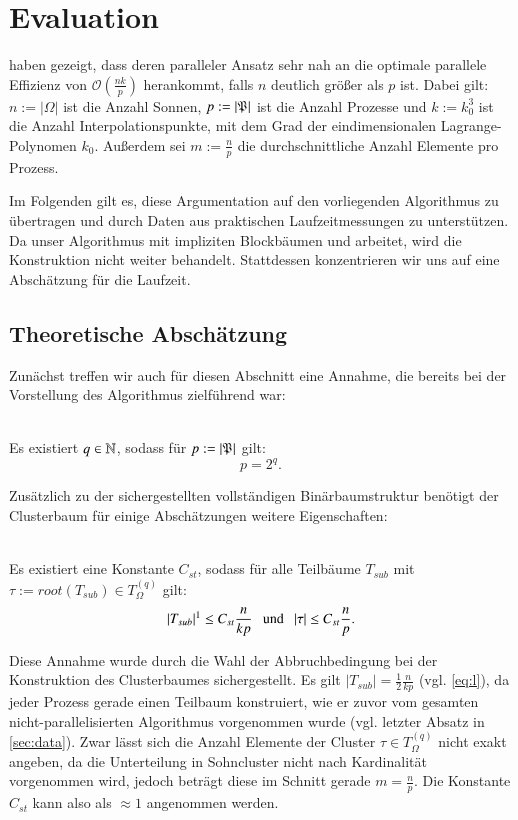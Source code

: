 \chapter{Evaluation}
\label{chp:eval}
  \citet{distrh2} haben gezeigt, dass deren paralleler Ansatz sehr nah an die optimale parallele Effizienz von $\mathcal{O}(\frac{nk}{p})$ herankommt, falls $n$ deutlich größer als $p$ ist.
  Dabei gilt: $n := |\Omega|$ ist die Anzahl Sonnen, $p := |\mathfrak{P}|$ ist die Anzahl Prozesse und $k := k_0^3$ ist die Anzahl Interpolationspunkte, mit dem Grad der eindimensionalen Lagrange-Polynomen 
  $k_0$. Außerdem sei $m := \frac{n}{p}$ die durchschnittliche Anzahl Elemente pro Prozess.
  
  Im Folgenden gilt es, diese Argumentation auf den vorliegenden Algorithmus zu übertragen und durch Daten aus praktischen Laufzeitmessungen zu unterstützen. Da unser Algorithmus mit impliziten
  Blockbäumen und \hquad arbeitet, wird die Konstruktion nicht weiter behandelt. Stattdessen konzentrieren wir uns auf eine Abschätzung für die Laufzeit.
  
  \section{Theoretische Abschätzung}
  \label{sec:theo}
  
  Zunächst treffen wir auch für diesen Abschnitt eine Annahme, die bereits bei der Vorstellung des Algorithmus zielführend war:
  \begin{ann} \ \\
  \label{ann:nodes}
    Es existiert $q \in \mathbb{N}$, sodass für $p := \left| \mathfrak{P} \right|$ gilt:
    \[ p = 2^q. \]
  \end{ann}
  
  Zusätzlich zu der sichergestellten vollständigen Binärbaumstruktur benötigt der Clusterbaum für einige Abschätzungen weitere Eigenschaften:
  
  \begin{ann} \ \\
  \label{ann:tree}
    Es existiert eine Konstante $C_{st}$, sodass für alle Teilbäume $T_{sub}$ mit $\tau := root(T_{sub}) \in T_\Omega^{(q)}$ gilt:
    \[
     |T_{sub}|\footnotemark \leq C_{st} \frac{n}{kp} \ \ \text{ und } \ \ |\tau| \leq C_{st}\frac{n}{p}.
    \]
  \end{ann}
  
  Diese Annahme wurde durch die Wahl der Abbruchbedingung bei der Konstruktion des Clusterbaumes sichergestellt. Es gilt $|T_{sub}| = \frac{1}{2} \frac{n}{kp}$ (vgl. \autoref{eq:l}),
  da jeder Prozess gerade einen Teilbaum konstruiert, wie er zuvor vom gesamten nicht-parallelisierten Algorithmus vorgenommen wurde (vgl. letzter Absatz in \autoref{sec:data}). Zwar lässt sich die
  Anzahl Elemente der Cluster $\tau \in T_\Omega^{(q)}$ nicht exakt angeben, da die Unterteilung in Sohncluster nicht nach Kardinalität vorgenommen wird, jedoch beträgt diese im Schnitt gerade 
  $m = \frac{n}{p}$. Die Konstante $C_{st}$ kann also als $\approx 1$ angenommen werden.
  
